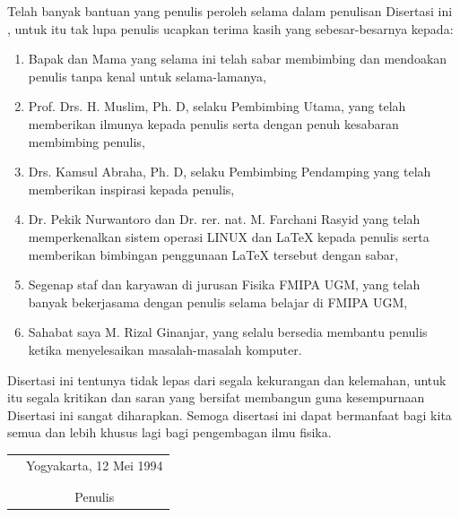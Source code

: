 \documentclass[disertasi]{ugmdisertasi}
\begin{document}
Telah banyak bantuan yang penulis peroleh selama dalam penulisan Disertasi ini
, untuk itu tak lupa penulis ucapkan terima kasih yang sebesar-besarnya
kepada:
\begin{enumerate}
\item{Bapak dan Mama yang selama ini telah sabar membimbing dan mendoakan
penulis tanpa kenal untuk selama-lamanya,}
\item{Prof. Drs. H. Muslim, Ph. D, selaku Pembimbing Utama, yang telah
memberikan ilmunya kepada penulis serta dengan penuh kesabaran membimbing penulis,}
\item{Drs. Kamsul Abraha, Ph. D, selaku Pembimbing Pendamping yang telah
memberikan inspirasi kepada penulis,} 
\item{Dr. Pekik Nurwantoro dan Dr. rer. nat. M. Farchani Rasyid
yang telah memperkenalkan sistem operasi LINUX dan \LaTeX{} kepada penulis serta
memberikan bimbingan penggunaan \LaTeX{} tersebut dengan sabar,} 
\item{Segenap staf dan karyawan di jurusan Fisika FMIPA UGM, yang telah
banyak bekerjasama dengan penulis selama belajar di FMIPA UGM,} 
\item{Sahabat saya M. Rizal Ginanjar, yang selalu bersedia membantu penulis ketika
menyelesaikan masalah-masalah komputer.} 
\end{enumerate}

Disertasi ini tentunya tidak lepas dari segala kekurangan dan kelemahan, untuk itu
segala kritikan dan saran yang bersifat membangun guna kesempurnaan Disertasi ini
sangat diharapkan. Semoga disertasi ini dapat bermanfaat bagi kita semua dan lebih
khusus lagi bagi pengembagan ilmu fisika.

\begin{tabular}{p{7.5cm}c}
&Yogyakarta, 12 Mei 1994\\
&\\
&\\
&Penulis
\end{tabular}
\vfill

\tableofcontents
\listoftables
\listoffigures
\end{document}
